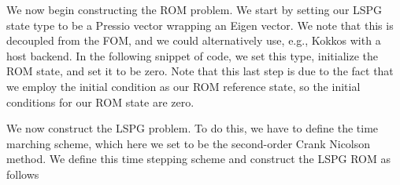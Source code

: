 We now begin constructing the ROM problem. We start by setting our LSPG state type to be a Pressio vector wrapping an Eigen vector. We note that this is decoupled from the FOM, and we could alternatively use, e.\+g., Kokkos with a host backend. In the following snippet of code, we set this type, initialize the ROM state, and set it to be zero. Note that this last step is due to the fact that we employ the initial condition as our ROM reference state, so the initial conditions for our ROM state are zero. 
\begin{DoxyCode}{0}
\DoxyCodeLine{\textcolor{comment}{// -\/-\/-\/-\/-\/-\/-\/-\/-\/-\/-\/-\/-\/-\/-\/-\/-\/-\/-\/-\/-\/-\/-\/-\/-\/-\/-\/-\/-\/-\/-\/-\/-\/-\/-\/-\/-\/-\/-\/-\/-\/-\/-\/-\/-\/-\/-\/-\/-\/-\/-\/-\/-\/-\/-\/}}
\DoxyCodeLine{\textcolor{comment}{// create ROM problem}}
\DoxyCodeLine{\textcolor{comment}{// -\/-\/-\/-\/-\/-\/-\/-\/-\/-\/-\/-\/-\/-\/-\/-\/-\/-\/-\/-\/-\/-\/-\/-\/-\/-\/-\/-\/-\/-\/-\/-\/-\/-\/-\/-\/-\/-\/-\/-\/-\/-\/-\/-\/-\/-\/-\/-\/-\/-\/-\/-\/-\/-\/-\/}}
\DoxyCodeLine{\textcolor{comment}{// define ROM state}}
\DoxyCodeLine{\textcolor{comment}{// initialize to zero (reference state is IC)}}

\end{DoxyCode}


We now construct the LSPG problem. To do this, we have to define the time marching scheme, which here we set to be the second-\/order Crank Nicolson method. We define this time stepping scheme and construct the LSPG ROM as follows 
\begin{DoxyCode}{0}
\DoxyCodeLine{\textcolor{comment}{// define LSPG type}}

\end{DoxyCode}


